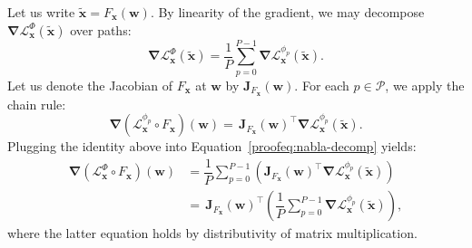 \documentclass{article} %
\theoremstyle{plain}
\theoremstyle{definition}
\theoremstyle{remark}
\begin{document}
Let us write $\boldsymbol{\tilde{x}} = F_{\boldsymbol{x}}(\boldsymbol{w})$.
By linearity of the gradient, we may decompose $\boldsymbol{\nabla}\mathcal{L}_{\boldsymbol{x}}^{\Phi}(\boldsymbol{\tilde{x}})$ over paths:
\begin{equation}
\boldsymbol{\nabla}\mathcal{L}_{\boldsymbol{x}}^{\Phi}(\boldsymbol{\tilde{x}}) = \dfrac{1}{P}
\sum_{p=0}^{P-1} \boldsymbol{\nabla}\mathcal{L}_{\boldsymbol{x}}^{\phi_p}(\boldsymbol{\tilde{x}}).
\label{proofeq:nabla-decomp}
\end{equation}
Let us denote the Jacobian of $F_{\boldsymbol{x}}$ at $\boldsymbol{w}$ by $\mathbf{J}_{F_{\boldsymbol{x}}}(\boldsymbol{w})$.
For each $p \in \mathcal{P}$, we apply the chain rule:
\begin{equation}
\boldsymbol{\nabla}(\mathcal{L}_{\boldsymbol{x}}^{\phi_p}\circ F_{\boldsymbol{x}})(\boldsymbol{w}) =
\, \mathbf{J}_{F_{\boldsymbol{x}}}(\boldsymbol{w})^{\top} \boldsymbol{\nabla}\mathcal{L}_{\boldsymbol{x}}^{\phi_p}(\boldsymbol{\tilde{x}}).
\label{eq:chain-rule}
\end{equation}
Plugging the identity above into Equation~\ref{proofeq:nabla-decomp} yields:
\begin{align}
\boldsymbol{\nabla}(\mathcal{L}_{\boldsymbol{x}}^{\Phi}\circ F_{\boldsymbol{x}})(\boldsymbol{w}) 
&= \dfrac{1}{P} \sum_{p=0}^{P-1} \left(\mathbf{J}_{F_{\boldsymbol{x}}}(\boldsymbol{w})^{\top} \boldsymbol{\nabla}\mathcal{L}_{\boldsymbol{x}}^{\phi_p}(\boldsymbol{\tilde{x}}) \right) \nonumber \\
&= \, \mathbf{J}_{F_{\boldsymbol{x}}}(\boldsymbol{w})^{\top} \left(\dfrac{1}{P} \sum_{p=0}^{P-1} \boldsymbol{\nabla}\mathcal{L}_{\boldsymbol{x}}^{\phi_p}(\boldsymbol{\tilde{x}}) \right),
\label{proofeq:distributivity}
\end{align}
where the latter equation holds by distributivity of matrix multiplication.
\end{document}
